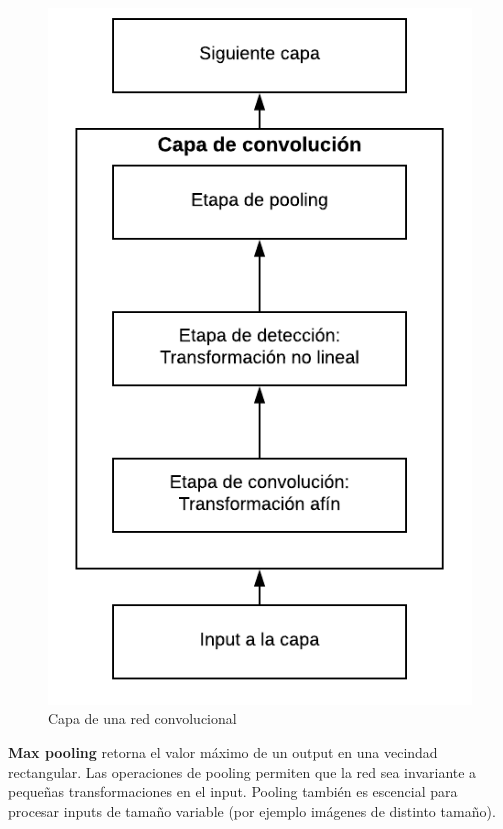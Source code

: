 \begin{figure}[H]
\captionsetup{font=small,labelfont=small}
\caption{Capa de una red convolucional}
\centering
\includegraphics[scale=.8]{img/CNN.png}
\end{figure}

\textbf{Max pooling} retorna el valor m\'aximo de un output en una vecindad rectangular. Las operaciones de pooling permiten que la red sea invariante a peque{\~{n}}as transformaciones en el input. Pooling tambi\'en es escencial para procesar inputs de tama{\~{n}}o variable (por ejemplo im\'agenes de distinto tama{\~{n}}o).


